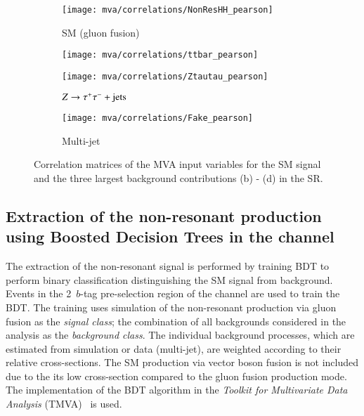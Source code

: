\begin{figure}[htbp]
  \centering

  \begin{subfigure}[t]{.49\textwidth}
    \texttt{[image: mva/correlations/NonResHH\_pearson]}
    \caption{SM \HH (gluon fusion)}
  \end{subfigure}\hfill %
  \begin{subfigure}[t]{.49\textwidth}
    \texttt{[image: mva/correlations/ttbar\_pearson]}
    \caption{\ttbar}
  \end{subfigure}

  \begin{subfigure}[t]{.49\textwidth}
    \texttt{[image: mva/correlations/Ztautau\_pearson]}
    \caption{$Z \rightarrow \tau^{+} \tau^{-} + \text{jets}$}
  \end{subfigure}\hfill %
  \begin{subfigure}[t]{.49\textwidth}
    \texttt{[image: mva/correlations/Fake\_pearson]}
    \caption{Multi-jet}
  \end{subfigure}

  \caption{Correlation matrices of the MVA input variables for the SM
    \HH signal and the three largest background contributions (b) -
    (d) in the \hadhad SR.}
  \label{fig:mva_input_correlations}
\end{figure}


\subsection{Extraction of the non-resonant \HH production using
  Boosted Decision Trees in the \hadhad channel}
\label{sec:mva_smbdt}

The extraction of the non-resonant \HH signal is performed by training
BDT to perform binary classification distinguishing the SM \HH signal
from background. Events in the 2~$b$-tag pre-selection region of the
\hadhad channel are used to train the BDT. The training uses
simulation of the non-resonant \HH production via gluon fusion as the
\emph{signal class}; the combination of all backgrounds considered in
the analysis as the \emph{background class}.  The individual
background processes, which are estimated from simulation or data
(multi-jet), are weighted according to their relative
cross-sections. The SM \HH production via vector boson fusion is not
included due to the its low cross-section compared to the gluon fusion
production mode. The implementation of the BDT algorithm in the
\emph{Toolkit for Multivariate Data Analysis}
(TMVA)~\cite{Hocker:2007ht} is used.


